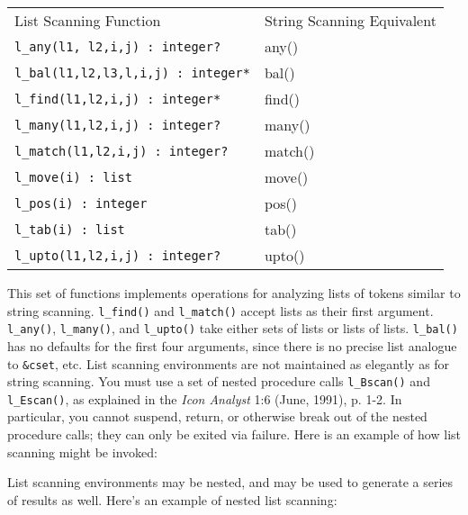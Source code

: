 \begin{supertabular}{m{3in} m{2in}}
List Scanning Function & String Scanning Equivalent \\

\texttt{l\_any(l1, l2,i,j) : integer?} & any()\\
\texttt{l\_bal(l1,l2,l3,l,i,j) : integer*} & bal()\\
\texttt{l\_find(l1,l2,i,j) : integer*} & find()\\
\texttt{l\_many(l1,l2,i,j) : integer?} &  many()\\
\texttt{l\_match(l1,l2,i,j) : integer?} &  match()\\
\texttt{l\_move(i) : list} & move()\\
\texttt{l\_pos(i) : integer} & pos()\\
\texttt{l\_tab(i) : list} & tab()\\
\texttt{l\_upto(l1,l2,i,j) : integer?} & upto()\\
\end{supertabular}

This set of functions implements operations for analyzing lists of
tokens similar to string scanning. \texttt{l\_find()} and
\texttt{l\_match()} accept lists as their first argument.
\texttt{l\_any()}, \texttt{l\_many()}, and \texttt{l\_upto()} take
either sets of lists or lists of lists. \texttt{l\_bal()} has no
defaults for the first four arguments, since there is no precise list
analogue to \texttt{\&cset}, etc. List scanning environments are not
maintained as elegantly as for string scanning. You must use a set of
nested procedure calls \texttt{l\_Bscan()} and \texttt{l\_Escan()}, as
explained in the \textit{Icon Analyst} 1:6 (June, 1991), p. 1-2. In
particular, you cannot suspend, return, or otherwise break out of the
nested procedure calls; they can only be exited via failure. Here is an
example of how list scanning might be invoked:


List scanning environments may be nested, and may be used to generate a
series of results as well. Here's an example of nested
list scanning:

